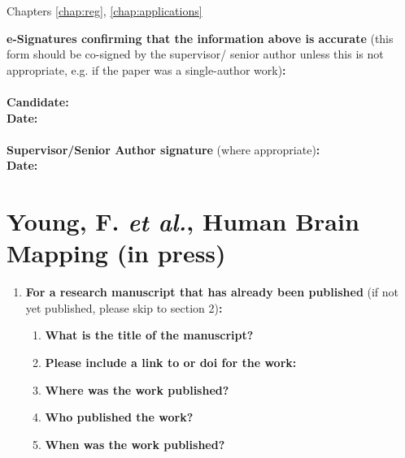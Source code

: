{\begin{enumerate}[leftmargin=*,label={\bfseries\arabic*.}]
	Chapters \ref{chap:reg}, \ref{chap:applications}

	\end{enumerate}

	\textbf{e-Signatures confirming that the information above is accurate}
	(this form should be co-signed by the supervisor/ senior author unless this is not appropriate, e.g. if the paper was a single-author work)\textbf{:}\\
	\textbf{}\\
	\textbf{Candidate:}\\
	\textbf{Date:}\\
	\textbf{}\\
	\textbf{Supervisor/Senior Author signature} (where appropriate)\textbf{:}\\
	\textbf{Date:}


\section*{Young, F. \textit{et al.}, Human Brain Mapping (in press)}
	\begin{enumerate}[leftmargin=*,label={\bfseries\arabic*.}]\itemsep0em
	\item \textbf{For a research manuscript that has already been published} (if not yet published, please skip to section 2)\textbf{:}
	\begin{enumerate}[label={\alph*)}]\itemsep0em
		\item \textbf{What is the title of the manuscript?}


		\item \textbf{Please include a link to or doi for the work:}


		\item \textbf{Where was the work published?}


		\item \textbf{Who published the work?}


		\item \textbf{When was the work published?}


\end{enumerate}
\end{enumerate}}
